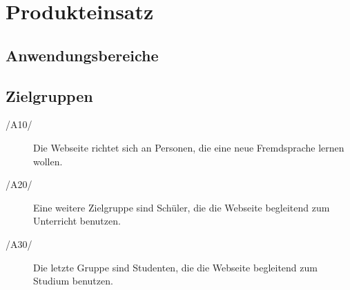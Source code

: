 \section{Produkteinsatz}

\subsection{Anwendungsbereiche}

\subsection{Zielgruppen}
\begin{description}
	\item[/A10/] Die Webseite richtet sich an Personen, die eine neue Fremdsprache lernen wollen.
	\item[/A20/] Eine weitere Zielgruppe sind Schüler, die die Webseite begleitend zum Unterricht benutzen.
	\item[/A30/] Die letzte Gruppe sind Studenten, die die Webseite begleitend zum Studium benutzen.
\end{description}

